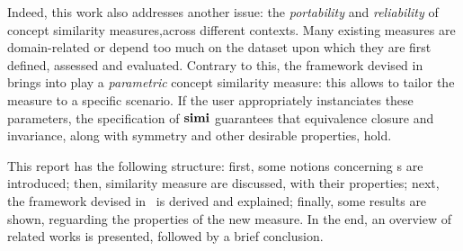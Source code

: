 Indeed, this work also addresses another issue: the \emph{portability} and \emph{reliability} of concept similarity measures,across different contexts.
Many existing measures are domain-related or depend too much on the dataset upon which they are first defined, assessed and evaluated.
Contrary to this, the framework devised in~\cite{LeTu12} brings into play a \emph{parametric} concept similarity measure: this allows to tailor the measure to a specific scenario.
If the user appropriately instanciates these parameters, the specification of \(\mathbf{simi}\) guarantees that equivalence closure and invariance, along with symmetry and other desirable properties, hold.

This report has the following structure:
first, some notions concerning \dl{}s are introduced;
then, similarity measure are discussed, with their properties;
next, the framework devised in~\cite{LeTu12} is derived and explained;
finally, some results are shown, reguarding the properties of the new measure.
In the end, an overview of related works is presented, followed by a brief conclusion.

